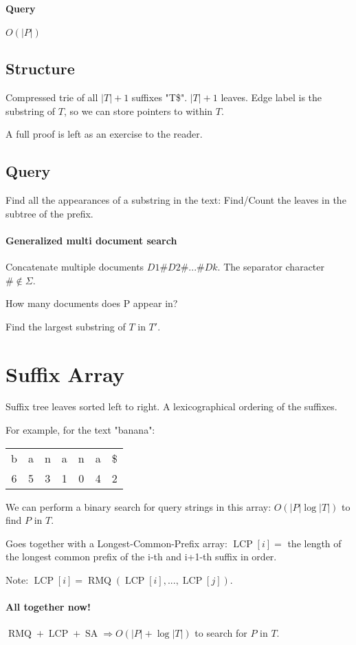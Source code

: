 \documentclass[a4paper]{article}
\DeclareMathOperator{\LCP}{LCP}
\DeclareMathOperator{\RMQ}{RMQ}
\DeclareMathOperator{\SA}{SA}
\begin{document}
\paragraph{Query}
$O(|P|)$

\subsection{Structure}
Compressed trie of all $|T|+1$ suffixes "T\$".
$|T|+1$ leaves.
Edge label is the substring of $T$, so we can store pointers to within $T$.

A full proof is left as an exercise to the reader.

\subsection{Query}
Find all the appearances of a substring in the text:
Find/Count the leaves in the subtree of the prefix.

\paragraph{Generalized multi document search}
Concatenate multiple documents $D1\#D2\#...\#Dk$.
The separator character $\# \notin \Sigma$.

How many documents does P appear in?

Find the largest substring of $T$ in $T'$.

\section{Suffix Array}
Suffix tree leaves sorted left to right.
A lexicographical ordering of the suffixes.

For example, for the text "banana":
\begin{tabu} to \linewidth {ccccccc}
  b & a & n & a & n & a & \$ \\
  6 & 5 & 3 & 1 & 0 & 4 & 2
\end{tabu}

We can perform a binary search for query strings in this array: $O(|P|\log |T|)$ to find $P$ in $T$.

Goes together with a Longest-Common-Prefix array:
$\LCP[i]=$ the length of the longest common prefix of the i-th and i+1-th suffix in order.

Note: $\LCP[i]=\RMQ(\LCP[i],...,\LCP[j])$.

\paragraph{All together now!}
$\RMQ + \LCP + \SA \Rightarrow O(|P|+\log |T|)$ to search for $P$ in $T$.
\end{document}
